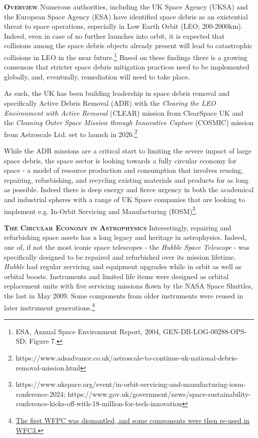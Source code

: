 \documentclass[a4paper,12pt]{texMemo}
\begin{document}
\maketitle

\vspace{-12pt}
\noindent
{\bfseries \textsc{\textcolor{Cerulean}{Overview}}} Numerous
authorities, including the UK Space Agency (UKSA) and the European
Space Agency (ESA) have identified space debris as an existential
threat to space operations, especially in Low Earth Orbit (LEO;
200-2000km).  Indeed, even in case of no further launches into orbit,
it is expected that collisions among the space debris objects already
present will lead to catastrophic collisions in LEO in the near
future.\footnote{ESA, Annual Space Environment Report, 2004,
GEN-DB-LOG-00288-OPS-SD; Figure 7.}  Based on these findings there is
a growing consensus that stricter space debris mitigation practices
need to be implemented globally, and, eventually, remediation will need to 
take place. 

\smallskip
\smallskip
\noindent
As such, the UK has been building leadership in space debris removal
and specifically Active Debris Removal (ADR) with the \textit{Clearing
the LEO Environment with Active Removal} (CLEAR) mission from
ClearSpace UK and the \textit{Cleaning Outer Space Mission through
Innovative Capture} (COSMIC) mission from Astroscale Ltd. set to
launch in 2026.\footnote{https://www.adsadvance.co.uk/astroscale-to-continue-uk-national-debris-removal-mission.html}

\smallskip
\smallskip
\noindent
While the ADR missions are a critical start to limiting the severe
impact of large space debris, the space sector is looking towards a
fully circular economy for space - a model of resource production and
consumption that involves reusing, repairing, refurbishing, and
recycling existing materials and products for as long as possible.
Indeed there is deep energy and fierce urgency in both the academical and industrial
spheres with a range of UK Space companies that are looking to
implement e.g. In-Orbit Servicing and Manufacturing
(IOSM)\footnote{https://www.ukspace.org/event/in-orbit-servicing-and-manufacturing-iosm-conference-2024; https://www.gov.uk/government/news/space-sustainability-conference-kicks-off-with-18-million-for-tech-innovation}.

\smallskip
\smallskip
\noindent
{\bfseries \textsc{\textcolor{Cerulean}{The Circular Economy in Astrophysics}}}
Interestingly, repairing and refurbishing space assets has a long
legacy and heritage in astrophysics.  Indeed, one of, if not the most
iconic space telescopes - the \textit{Hubble Space Telescope} - was
specifically designed to be repaired and refurbished over its mission
lifetime.  \textit{Hubble} had regular servicing and equipment upgrades while in orbit as well as orbital boosts.  Instruments and limited life items were designed as orbital replacement units with
five servicing missions flown by the NASA Space Shuttles, the last in May
2009. Some components from older instruments were reused in later instrument generations.\footnote{\href{https://en.wikipedia.org/wiki/Hubble\_Space\_Telescope\#List\_of\_Hubble\_instruments}{The first WFPC was dismantled, and some components were then re-used in WFC3.}
}
\end{document}
